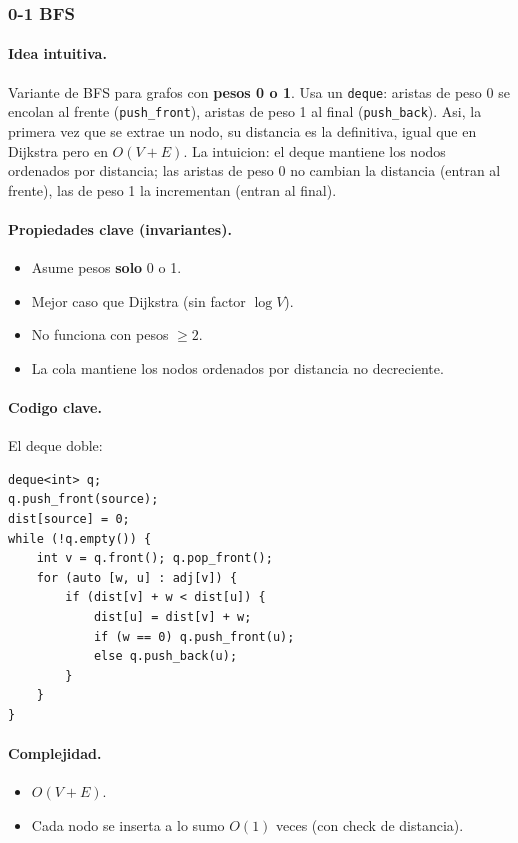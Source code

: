 ﻿\subsubsection{0-1 BFS}

\paragraph{Idea intuitiva.}
Variante de BFS para grafos con \textbf{pesos 0 o 1}. Usa un \texttt{deque}: aristas de peso 0 se encolan al frente (\texttt{push\_front}), aristas de peso 1 al final (\texttt{push\_back}). Asi, la primera vez que se extrae un nodo, su distancia es la definitiva, igual que en Dijkstra pero en $O(V + E)$. La intuicion: el deque mantiene los nodos ordenados por distancia; las aristas de peso 0 no cambian la distancia (entran al frente), las de peso 1 la incrementan (entran al final).

\paragraph{Propiedades clave (invariantes).}
\begin{itemize}\setlength\itemsep{0pt}
	\item Asume pesos \textbf{solo} 0 o 1.
	\item Mejor caso que Dijkstra (sin factor $\log V$).
	\item No funciona con pesos $\ge 2$.
	\item La cola mantiene los nodos ordenados por distancia no decreciente.
\end{itemize}

\paragraph{Codigo clave.}
El deque doble:
\begin{verbatim}
deque<int> q;
q.push_front(source);
dist[source] = 0;
while (!q.empty()) {
    int v = q.front(); q.pop_front();
    for (auto [w, u] : adj[v]) {
        if (dist[v] + w < dist[u]) {
            dist[u] = dist[v] + w;
            if (w == 0) q.push_front(u);
            else q.push_back(u);
        }
    }
}
\end{verbatim}

\paragraph{Complejidad.}
\begin{itemize}\setlength\itemsep{0pt}
	\item $O(V + E)$.
	\item Cada nodo se inserta a lo sumo $O(1)$ veces (con check de distancia).
\end{itemize}

